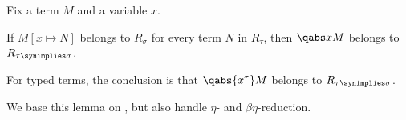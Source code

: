 \begin{lemma}\label{thm:reducibility_candidate_abstraction}
  Fix a term \( M \) and a variable \( x \).

  If \( M[x \mapsto N] \) belongs to \( R_\sigma \) for every term \( N \) in \( R_\tau \), then \( \qabs x M \) belongs to \( R_{\tau \synimplies \sigma} \).

  For typed terms, the conclusion is that \( \qabs {x^\tau} M \) belongs to \( R_{\tau \synimplies \sigma} \).
\end{lemma}
\begin{comments}
  \item We base this lemma on \cite[thm. 4.2.2.5]{Mimram2020ProgramEqualsProof}, but also handle \( \eta \)- and \( \beta\eta \)-reduction.
\end{comments}
